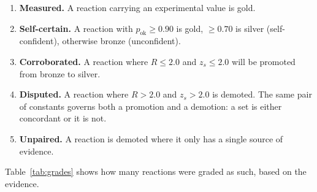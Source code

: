 \begin{enumerate} \item \textbf{Measured.} A reaction carrying an experimental value is gold. 
    
    \item \textbf{Self-certain.} A reaction with $p_{\text{ok}} \ge 0.90$ is gold, $\ge 0.70$ is silver (self-confident), otherwise bronze (unconfident). 
    
    \item \textbf{Corroborated.} A reaction where $R \le 2.0$ and $z_s \le 2.0$ will be promoted from bronze to silver.
    
    \item \textbf{Disputed.} A reaction where $R > 2.0$ and $z_s > 2.0$ is demoted. The same pair of constants governs both a promotion and a demotion: a set is either concordant or it is not. 
    
    \item \textbf{Unpaired.} A reaction is demoted where it only has a single source of evidence. \end{enumerate}
Table~\ref{tab:grades} shows how many reactions were graded as such, based on the evidence.

